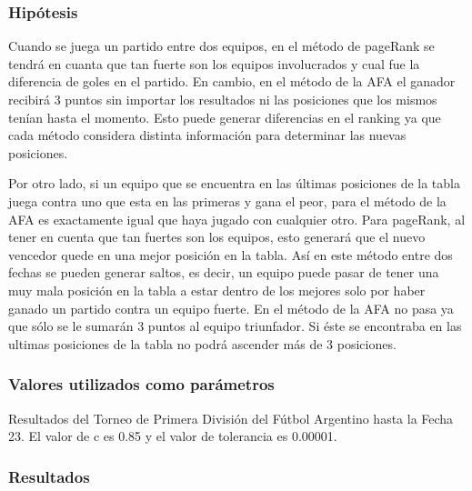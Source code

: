 		\subsubsection*{Hipótesis} 
		Cuando se juega un partido entre dos equipos, en el método de pageRank se tendrá en cuanta que tan fuerte son los equipos involucrados y cual fue la diferencia de goles en el partido. En cambio, en el método de la AFA el ganador recibirá 3 puntos sin importar los resultados ni las posiciones que los mismos tenían hasta el momento. Esto puede generar diferencias en el ranking ya que cada método considera distinta información para determinar las nuevas posiciones. 
		
		Por otro lado, si un equipo que se encuentra en las últimas posiciones de la tabla juega contra uno que esta en las primeras y gana el peor, para el método de la AFA es exactamente igual que haya jugado con cualquier otro. Para pageRank, al tener en cuenta que tan fuertes son los equipos, esto generará que el nuevo vencedor quede en una mejor posición en la tabla. Así en este método entre dos fechas se pueden generar saltos, es decir, un equipo puede pasar de tener una muy mala posición en la tabla a estar dentro de los mejores solo por haber ganado un partido contra un equipo fuerte. En el método de la AFA no pasa ya que sólo se le sumarán 3 puntos al equipo triunfador. Si éste se encontraba en las ultimas posiciones de la tabla no podrá ascender más de 3 posiciones. 		

		\subsubsection*{Valores utilizados como parámetros} 
			Resultados del Torneo de Primera División del Fútbol Argentino hasta la Fecha 23. El valor de c es 0.85 y el valor de tolerancia es 0.00001. 

		\subsubsection*{Resultados}

